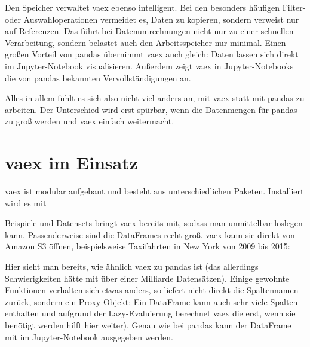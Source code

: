 Den Speicher verwaltet vaex ebenso intelligent. Bei den besonders häufigen Filter- oder Auswahloperationen vermeidet es, Daten zu kopieren, sondern verweist nur auf Referenzen. Das führt bei Datenumrechnungen nicht nur zu einer schnellen Verarbeitung, sondern belastet auch den Arbeitsspeicher nur minimal. Einen großen Vorteil von pandas übernimmt vaex auch gleich: Daten lassen sich direkt im Jupyter-Notebook visualisieren. Außerdem zeigt vaex in Jupyter-Notebooks die von pandas bekannten Vervollständigungen an.

Alles in allem fühlt es sich also nicht viel anders an, mit vaex statt mit pandas zu arbeiten. Der Unterschied wird erst spürbar, wenn die Datenmengen für pandas zu groß werden und vaex einfach weitermacht.


\section{vaex im Einsatz}


vaex ist modular aufgebaut und besteht aus unterschiedlichen Paketen. Installiert wird es mit

\medskip


\medskip

Beispiele und Datensets bringt vaex bereits mit, sodass man unmittelbar loslegen kann. Passenderweise sind die DataFrames recht groß. vaex kann sie direkt von Amazon S3 öffnen, beispielsweise Taxifahrten in New York von 2009 bis 2015:

\medskip




\medskip



\medskip

Hier sieht man bereits, wie ähnlich vaex zu pandas ist (das allerdings Schwierigkeiten hätte mit über einer Milliarde Datensätzen). Einige gewohnte Funktionen verhalten sich etwas anders, so liefert  nicht direkt die Spaltennamen zurück, sondern ein Proxy-Objekt: Ein DataFrame kann auch sehr viele Spalten enthalten und aufgrund der Lazy-Evaluierung berechnet vaex die erst, wenn sie benötigt werden  hilft hier weiter). Genau wie bei pandas kann der DataFrame mit  im Jupyter-Notebook ausgegeben werden.

